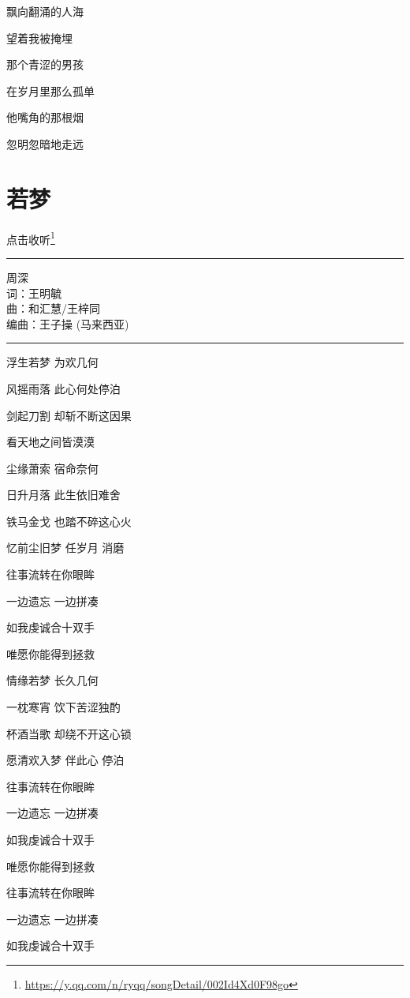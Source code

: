 \documentclass[]{ctexbook}
\renewcommand{\href}[2]{#2\footnote{\url{#1}}}
\begin{document}
飘向翻涌的人海

望着我被掩埋

那个青涩的男孩

在岁月里那么孤单

他嘴角的那根烟

忽明忽暗地走远

\section*{若梦}\label{ruomeng}


\href{https://y.qq.com/n/ryqq/songDetail/002Id4Xd0F98go}{点击收听}

\begin{center}\rule{0.5\linewidth}{0.5pt}\end{center}

周深\\
词：王明毓\\
曲：和汇慧/王梓同\\
编曲：王子操 (马来西亚)

\begin{center}\rule{0.5\linewidth}{0.5pt}\end{center}

浮生若梦 为欢几何

风摇雨落 此心何处停泊

剑起刀割 却斩不断这因果

看天地之间皆漠漠

尘缘萧索 宿命奈何

日升月落 此生依旧难舍

铁马金戈 也踏不碎这心火

忆前尘旧梦 任岁月 消磨

往事流转在你眼眸

一边遗忘 一边拼凑

如我虔诚合十双手

唯愿你能得到拯救

情缘若梦 长久几何

一枕寒宵 饮下苦涩独酌

杯酒当歌 却绕不开这心锁

愿清欢入梦 伴此心 停泊

往事流转在你眼眸

一边遗忘 一边拼凑

如我虔诚合十双手

唯愿你能得到拯救

往事流转在你眼眸

一边遗忘 一边拼凑

如我虔诚合十双手
\end{document}

